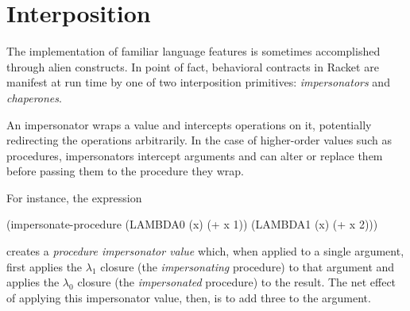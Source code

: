 \documentclass{sigplanconf}
\begin{document}




\section{Interposition}

The implementation of familiar language features is sometimes accomplished through alien constructs.
In point of fact, behavioral contracts in Racket are manifest at run time by one of two interposition primitives: \emph{impersonators} and \emph{chaperones}.

An impersonator wraps a value and intercepts operations on it, potentially redirecting the operations arbitrarily.
In the case of higher-order values such as procedures, impersonators intercept arguments and can alter or replace them before passing them to the procedure they wrap.

For instance, the expression
\begin{schemedisplay}
(impersonate-procedure (LAMBDA0 (x) (+ x 1)) (LAMBDA1 (x) (+ x 2)))
\end{schemedisplay}
creates a \emph{procedure impersonator value} which, when applied to a single argument, first applies the $\lambda_1$ closure (the \emph{impersonating} procedure) to that argument and applies the $\lambda_0$ closure (the \emph{impersonated} procedure) to the result.
The net effect of applying this impersonator value, then, is to add three to the argument.
\end{document}
